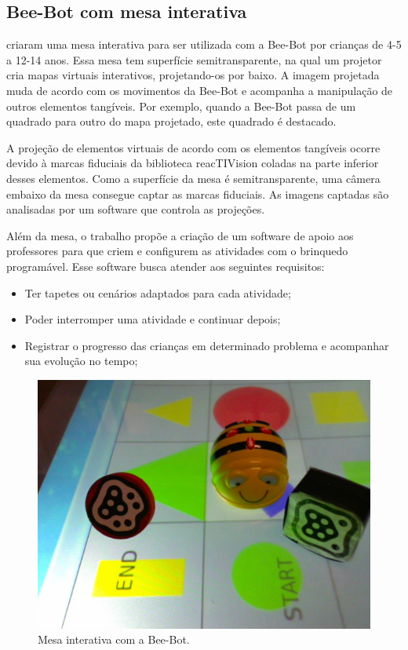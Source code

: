 \subsection{Bee-Bot com mesa interativa}
 criaram uma mesa interativa para ser utilizada com a Bee-Bot por crianças de 4-5 a 12-14 anos. Essa mesa tem superfície semitransparente, na qual um projetor cria mapas virtuais interativos, projetando-os por baixo. A imagem projetada muda de acordo com os movimentos da Bee-Bot e acompanha a manipulação de outros elementos tangíveis. Por exemplo, quando a Bee-Bot passa de um quadrado para outro do mapa projetado, este quadrado é destacado.

A projeção de elementos virtuais de acordo com os elementos tangíveis ocorre devido à marcas fiduciais da biblioteca reacTIVision coladas na parte inferior desses elementos. Como a superfície da mesa é semitransparente, uma câmera embaixo da mesa consegue captar as marcas fiduciais. As imagens captadas são analisadas por um software que controla as projeções.

Além da mesa, o trabalho propõe a criação de um software de apoio aos professores para que criem e configurem as atividades com o brinquedo programável. Esse software busca atender aos seguintes requisitos:

\begin{itemize}
    \item Ter tapetes ou cenários adaptados para cada atividade;
    \item Poder interromper uma atividade e continuar depois;
    \item Registrar o progresso das crianças em determinado problema e acompanhar sua evolução no tempo;
\end{itemize}

\begin{figure}[!h]
    \centering
    \includegraphics[width=.6\linewidth,fbox]{figs/beraza_bee_bot.png}
    \caption{Mesa interativa com a Bee-Bot.}
    \label{fig:beraza}
\end{figure}


